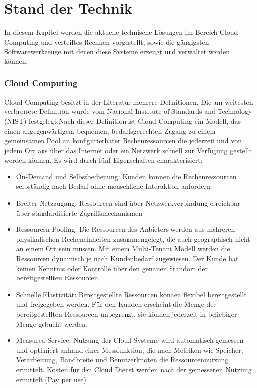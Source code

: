 \chapter{Stand der Technik}

In diesem Kapitel werden die aktuelle technische Lösungen im Bereich Cloud Computing und verteiltes Rechnen
vorgestellt, sowie die gängigsten Softwarewerkzeuge mit denen diese Systeme erzeugt und verwaltet werden können.

\subsection*{Cloud Computing}
Cloud Computing besitzt in der Literatur mehrere Definitionen.\cite{Marston2011} Die am weitesten verbreitete Definition wurde vom National Institute of Standards and Technology (NIST) festgelegt.Nach dieser Definition ist Cloud Computing ein Modell, das einen allgegenwärtigen, bequemen, bedarfsgerechten Zugang zu einem gemeinsamen Pool an konfigurierbarer Rechenressourcen die jederzeit und von jedem Ort aus über das Internet oder ein Netzwerk schnell zur Verfügung gestellt 
werden können. Es wird durch fünf Eigenschaften charakterisiert:   \\
\begin{itemize}
	\item On-Demand und Selbstbedienung: Kunden können die Rechenressourcen selbständig nach Bedarf ohne menschliche Interaktion anfordern
	\item Breiter Netzzugang: Ressourcen sind über Netzwerkverbindung erreichbar über standardisierte Zugriffsmechanismen
	\item Ressourcen-Pooling: Die Ressourcen des Anbieters werden aus mehreren physikalischen Recheneinheiten zusammengelegt, die auch geographisch nicht an einem Ort sein müssen. Mit einem Multi-Tenant Modell werden die Ressourcen dynamisch je nach Kundenbedarf zugewiesen. Der Kunde hat keinen Kenntnis oder Kontrolle über den genauen Standort der bereitgestellten Ressourcen.
	\item Schnelle Elastizität: Bereitgestellte Ressourcen können flexibel bereitgestellt und freigegeben werden. Für den Kunden erscheint die Menge der bereitgestellten Ressourcen unbegrenzt, sie können jederzeit in beliebiger Menge gebucht werden.
	\item Measured Service: Nutzung der Cloud Systeme wird automatisch gemessen und optimiert anhand einer Messfunktion, die nach Metriken wie Speicher, Verarbeitung, Bandbreite und Benutzerknoten die Ressourcennutzung ermittelt. Kosten für den Cloud Dienst werden nach der gemessenen Nutzung ermittelt (Pay per use) \cite{Mell2011}
\end{itemize}


